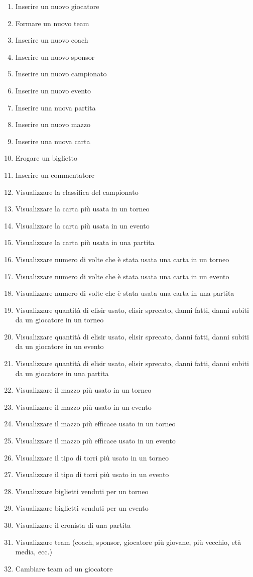 \documentclass{article}
\begin{document}
\begin{enumerate}
    \item Inserire un nuovo giocatore
    \item Formare un nuovo team
    \item Inserire un nuovo coach
    \item Inserire un nuovo sponsor
    \item Inserire un nuovo campionato
    \item Inserire un nuovo evento
    \item Inserire una nuova partita
    \item Inserire un nuovo mazzo
    \item Inserire una nuova carta
    \item Erogare un biglietto
    \item Inserire un commentatore
    \item Visualizzare la classifica del campionato
    \item Visualizzare la carta più usata in un torneo
    \item Visualizzare la carta più usata in un evento
    \item Visualizzare la carta più usata in una partita
    \item Visualizzare numero di volte che è stata usata una carta in un torneo
    \item Visualizzare numero di volte che è stata usata una carta in un evento
    \item Visualizzare numero di volte che è stata usata una carta in una partita
    \item Visualizzare quantità di elisir usato, elisir sprecato, danni fatti, danni subiti da un giocatore in un torneo
    \item Visualizzare quantità di elisir usato, elisir sprecato, danni fatti, danni subiti da un giocatore in un evento
    \item Visualizzare quantità di elisir usato, elisir sprecato, danni fatti, danni subiti da un giocatore in una partita
    \item Visualizzare il mazzo più usato in un torneo
    \item Visualizzare il mazzo più usato in un evento
    \item Visualizzare il mazzo più efficace usato in un torneo
    \item Visualizzare il mazzo più efficace usato in un evento
    \item Visualizzare il tipo di torri più usato in un torneo
    \item Visualizzare il tipo di torri più usato in un evento
    \item Visualizzare biglietti venduti per un torneo 
    \item Visualizzare biglietti venduti per un evento  
    \item Visualizzare il cronista di una partita
    \item Visualizzare team (coach, sponsor, giocatore più giovane, più vecchio, età media, ecc.)
    \item Cambiare team ad un giocatore
    
\end{enumerate}
\end{document}
